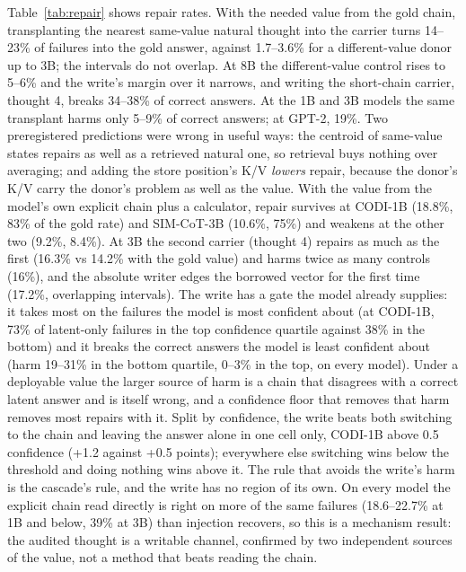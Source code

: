 \documentclass{article}
\begin{document}
Table~\ref{tab:repair} shows repair rates. With the needed value from the gold chain, transplanting the nearest same-value natural thought into the carrier turns 14--23\% of failures into the gold answer, against 1.7--3.6\% for a different-value donor up to 3B; the intervals do not overlap. At 8B the different-value control rises to 5--6\% and the write's margin over it narrows, and writing the short-chain carrier, thought 4, breaks 34--38\% of correct answers. At the 1B and 3B models the same transplant harms only 5--9\% of correct answers; at GPT-2, 19\%. Two preregistered predictions were wrong in useful ways: the centroid of same-value states repairs as well as a retrieved natural one, so retrieval buys nothing over averaging; and adding the store position's K/V \emph{lowers} repair, because the donor's K/V carry the donor's problem as well as the value. With the value from the model's own explicit chain plus a calculator, repair survives at CODI-1B (18.8\%, 83\% of the gold rate) and SIM-CoT-3B (10.6\%, 75\%) and weakens at the other two (9.2\%, 8.4\%). At 3B the second carrier (thought 4) repairs as much as the first (16.3\% vs 14.2\% with the gold value) and harms twice as many controls (16\%), and the absolute writer edges the borrowed vector for the first time (17.2\%, overlapping intervals). The write has a gate the model already supplies: it takes most on the failures the model is most confident about (at CODI-1B, 73\% of latent-only failures in the top confidence quartile against 38\% in the bottom) and it breaks the correct answers the model is least confident about (harm 19--31\% in the bottom quartile, 0--3\% in the top, on every model). Under a deployable value the larger source of harm is a chain that disagrees with a correct latent answer and is itself wrong, and a confidence floor that removes that harm removes most repairs with it. Split by confidence, the write beats both switching to the chain and leaving the answer alone in one cell only, CODI-1B above 0.5 confidence (+1.2 against +0.5 points); everywhere else switching wins below the threshold and doing nothing wins above it. The rule that avoids the write's harm is the cascade's rule, and the write has no region of its own. On every model the explicit chain read directly is right on more of the same failures (18.6--22.7\% at 1B and below, 39\% at 3B) than injection recovers, so this is a mechanism result: the audited thought is a writable channel, confirmed by two independent sources of the value, not a method that beats reading the chain.
\end{document}
